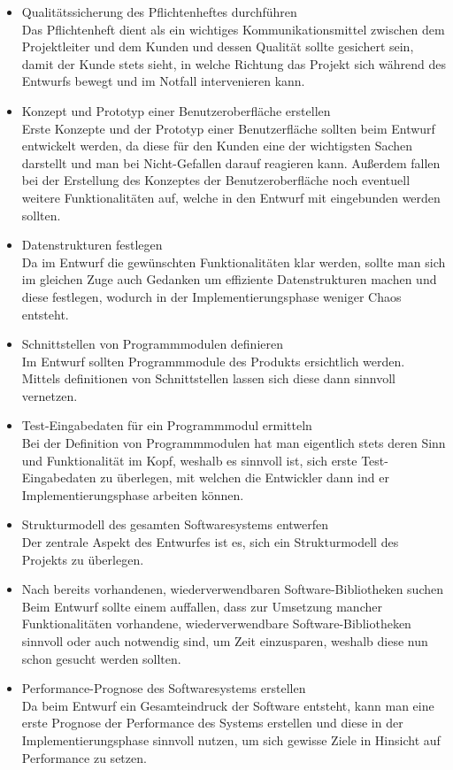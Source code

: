 \documentclass[a4paper,graphics,11pt]{article}
\begin{document}
\begin{itemize}
\item Qualitätssicherung des Pflichtenheftes durchführen\\
Das Pflichtenheft dient als ein wichtiges Kommunikationsmittel zwischen dem Projektleiter und dem Kunden und dessen Qualität sollte gesichert sein, damit
der Kunde stets sieht, in welche Richtung das Projekt sich während des Entwurfs bewegt und im Notfall intervenieren kann.
\item Konzept und Prototyp einer Benutzeroberfläche erstellen\\
Erste Konzepte und der Prototyp einer Benutzerfläche sollten beim Entwurf entwickelt werden, da diese für den Kunden eine der wichtigsten Sachen darstellt und man
bei Nicht-Gefallen darauf reagieren kann. Außerdem fallen bei der Erstellung des Konzeptes der Benutzeroberfläche noch eventuell weitere Funktionalitäten auf, welche in 
den Entwurf mit eingebunden werden sollten.
\item Datenstrukturen festlegen\\
Da im Entwurf die gewünschten Funktionalitäten klar werden, sollte man sich im gleichen Zuge auch Gedanken um effiziente Datenstrukturen machen und diese festlegen, wodurch
in der Implementierungsphase weniger Chaos entsteht.
\item Schnittstellen von Programmmodulen definieren\\
Im Entwurf sollten Programmmodule des Produkts ersichtlich werden. Mittels definitionen von Schnittstellen lassen sich diese dann sinnvoll vernetzen.
\item Test-Eingabedaten für ein Programmmodul ermitteln\\
Bei der Definition von Programmmodulen hat man eigentlich stets deren Sinn und Funktionalität im Kopf, weshalb es sinnvoll ist, sich erste Test-Eingabedaten zu überlegen,
mit welchen die Entwickler dann ind er Implementierungsphase arbeiten können.
\item Strukturmodell des gesamten Softwaresystems entwerfen \\
Der zentrale Aspekt des Entwurfes ist es, sich ein Strukturmodell des Projekts zu überlegen.
\item Nach bereits vorhandenen, wiederverwendbaren Software-Bibliotheken suchen\\
Beim Entwurf sollte einem auffallen, dass zur Umsetzung mancher Funktionalitäten vorhandene, wiederverwendbare Software-Bibliotheken sinnvoll oder auch notwendig sind, um
Zeit einzusparen, weshalb diese nun schon gesucht werden sollten.
\item Performance-Prognose des Softwaresystems erstellen\\
Da beim Entwurf ein Gesamteindruck der Software entsteht, kann man eine erste Prognose der Performance des Systems erstellen und diese in der Implementierungsphase
sinnvoll nutzen, um sich gewisse Ziele in Hinsicht auf Performance zu setzen.
\end{itemize} \ \\ \ \\
\end{document}
